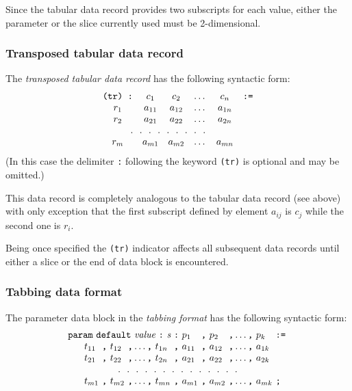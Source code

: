 \documentclass[10pt]{article}
\begin{document}
Since the tabular data record provides two subscripts for each value,
either the parameter or the slice currently used must be 2-dimensional.

\subsubsection{Transposed tabular data record}

The {\it transposed tabular data record} has the following syntactic
form:
$$\begin{array}{cccccc}
\mbox{{\tt(tr) :}}&c_1&c_2&\dots&c_n&\mbox{{\tt:=}}\\
r_1&a_{11}&a_{12}&\dots&a_{1n}&\\
r_2&a_{21}&a_{22}&\dots&a_{2n}&\\
\multicolumn{5}{c}{.\ \ .\ \ .\ \ .\ \ .\ \ .\ \ .\ \ .\ \ .}&\\
r_m&a_{m1}&a_{m2}&\dots&a_{mn}&\\
\end{array}$$
(In this case the delimiter {\tt:} following the keyword {\tt(tr)} is
optional and may be omitted.)

This data record is completely analogous to the tabular data record
(see above) with only exception that the first subscript defined by
element $a_{ij}$ is $c_j$ while the second one is $r_i$.

Being once specified the {\tt(tr)} indicator affects all subsequent
data records until either a slice or the end of data block is
encountered.

\subsubsection{Tabbing data format}

The parameter data block in the {\it tabbing format} has the following
syntactic form:
$$\begin{array}{p{12pt}@{\ }l@{\ }c@{\ }l@{\ }c@{\ }l@{\ }r@{\ }l@{\ }c
@{\ }l@{\ }c@{\ }l@{\ }l}
\multicolumn{7}{@{}c@{}}{\mbox{\tt param}\ \mbox{\tt default}\ \mbox
{\it value}\ \mbox{\tt:}\ \mbox{\it s}\ \mbox{\tt:}}&
p_1&\mbox{\tt,}&p_2&\mbox{\tt,} \dots \mbox{\tt,}&p_k&\mbox{\tt:=}\\
&t_{11}&\mbox{\tt,}&t_{12}&\mbox{\tt,} \dots \mbox{\tt,}&t_{1n}&
\mbox{\tt,}&a_{11}&\mbox{\tt,}&a_{12}&\mbox{\tt,} \dots \mbox{\tt,}&
a_{1k}\\
&t_{21}&\mbox{\tt,}&t_{22}&\mbox{\tt,} \dots \mbox{\tt,}&t_{2n}&
\mbox{\tt,}&a_{21}&\mbox{\tt,}&a_{22}&\mbox{\tt,} \dots \mbox{\tt,}&
a_{2k}\\
\multicolumn{13}{c}
{.\ \ .\ \ .\ \ .\ \ .\ \ .\ \ .\ \ .\ \ .\ \ .\ \ .\ \ .\ \ .\ \ .}\\
&t_{m1}&\mbox{\tt,}&t_{m2}&\mbox{\tt,} \dots \mbox{\tt,}&t_{mn}&
\mbox{\tt,}&a_{m1}&\mbox{\tt,}&a_{m2}&\mbox{\tt,} \dots \mbox{\tt,}&
a_{mk}&\mbox{\tt;}\\
\end{array}$$
\end{document}
